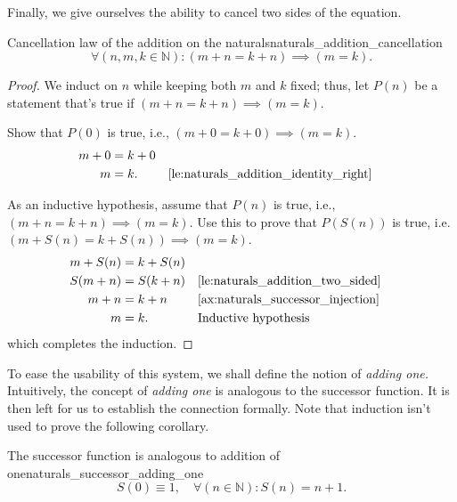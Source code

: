 Finally, we give ourselves the ability to cancel two sides of the equation.
\begin{lemma}{Cancellation law of the addition on the naturals}{naturals_addition_cancellation}
  \begin{equation*}
    \forall (n, m, k \in \mathbb{N}) : (m + n = k + n) \implies (m = k).
  \end{equation*}
\end{lemma}
\begin{proof}
  We induct on \(n\) while keeping both \(m\) and \(k\) fixed; thus, let \(P(n)\) be a statement
  that's true if \((m + n = k + n) \implies (m = k)\).

  \basecase Show that \(P(0)\) is true, i.e., \((m + 0 = k + 0) \implies (m = k)\).
  \begin{align}
    m + 0 & = k + 0                                                          \\
    m     & = k.    &  & \textrm{\Cref{le:naturals_addition_identity_right}}
  \end{align}

  \inductivestep As an inductive hypothesis, assume that \(P(n)\) is true, i.e.,
  \((m + n = k + n) \implies (m = k)\). Use this to prove that \(P(S(n))\) is true, i.e.
  \((m + S(n) = k + S(n)) \implies (m = k)\).
  \begin{align}
    m + S(n) & = k + S(n)                                                      \\
    S(m + n) & = S(k + n) &  & \textrm{\Cref{le:naturals_addition_two_sided}}  \\
    m + n    & = k + n    &  & \textrm{\Cref{ax:naturals_successor_injection}} \\
    m        & = k.       &  & \textrm{Inductive hypothesis}
  \end{align}
  which completes the induction.
\end{proof}

To ease the usability of this system, we shall define the notion of \emph{adding one.} Intuitively,
the concept of \emph{adding one} is analogous to the successor function. It is then left for us to
establish the connection formally. Note that induction isn't used to prove the following corollary.

\begin{cor}{The successor function is analogous to addition of one}{naturals_successor_adding_one}
  \begin{equation*}
    S(0) \equiv 1, \quad \forall (n \in \mathbb{N}) : S(n) = n + 1.
  \end{equation*}
\end{cor}

